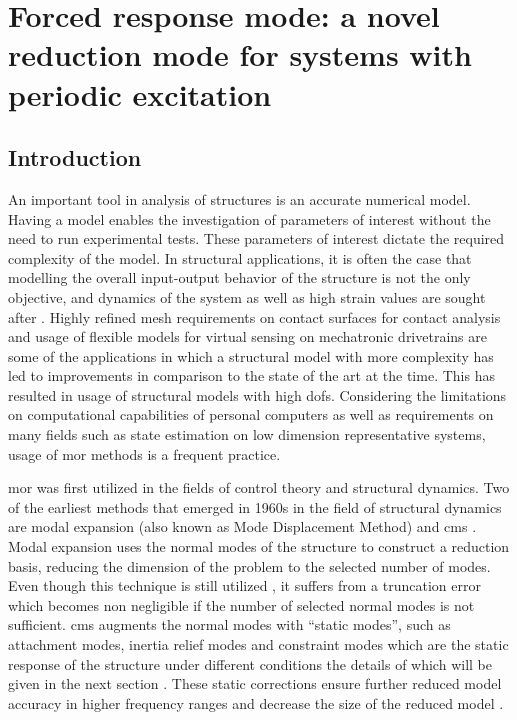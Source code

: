 \section{Forced response mode: a novel reduction mode for systems with periodic excitation}

\subsection{Introduction}

An important tool in analysis of structures is an accurate numerical model. Having a model enables the investigation of parameters of interest without the need to run experimental tests. These parameters of interest dictate the required complexity of the model. In structural applications, it is often the case that modelling the overall input-output behavior of the structure is not the only objective, and dynamics of the system as well as high strain values are sought after \cite{besselink_comparison_2013}. Highly refined mesh requirements on contact surfaces for contact analysis \cite{blockmans_model_2018} and usage of flexible models for virtual sensing on mechatronic drivetrains \cite{bosmans_virtual_2019} are some of the applications in which a structural model with more complexity has led to improvements in comparison to the state of the art at the time. This has resulted in usage of structural models with high \glspl{dof}. Considering the limitations on computational capabilities of personal computers as well as requirements on many fields such as state estimation on low dimension representative systems, usage of \gls{mor} methods is a frequent practice.

\gls{mor} was first utilized in the fields of control theory and structural dynamics\cite{besselink_comparison_2013,antoulas_approximation_2009}. Two of the earliest methods that emerged in 1960s in the field of structural dynamics are modal expansion (also known as Mode Displacement Method) and \gls{cms} \cite{geers_excitation_1969,craig_coupling_1968,hurty_vibrations_1961}. Modal expansion uses the normal modes of the structure to construct a reduction basis, reducing the dimension of the problem to the selected number of modes. Even though this technique is still utilized \cite{avitabile_prediction_2012,tarpo_expansion_2020}, it suffers from a truncation error which becomes non negligible if the number of selected normal modes is not sufficient. \gls{cms} augments the normal modes with “static modes”, such as attachment modes, inertia relief modes and constraint modes which are the static response of the structure under different conditions the details of which will be given in the next section \cite{craig_review_1985}. These static corrections ensure further reduced model accuracy in higher frequency ranges and decrease the size of the reduced model \cite{rixen_high_2002}.

